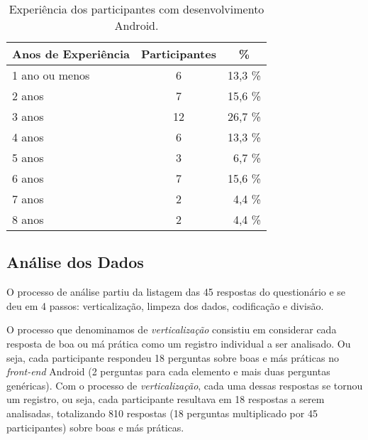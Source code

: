 \begin{table}[h]
\centering
\caption{Experi\^encia dos participantes com desenvolvimento Android.}
\small
\begin{tabular}{l|c|r}
\toprule
\textbf{Anos de Experi\^encia} & \textbf{Participantes} & \multicolumn{1}{c}{\textbf{\%}}  \\
\hline
1 ano ou menos 	&	 6 		& 	13,3 \%	 \\
2 anos 			& 	 7 		& 	15,6 \%	 \\
3 anos 			& 	 12		& 	26,7 \%	 \\
4 anos 			& 	 6 		& 	13,3 \%	 \\
5 anos 			& 	 3 		& 	 6,7 \%	 \\
6 anos 			& 	 7 		& 	15,6 \%	 \\
7 anos 			& 	 2 		& 	 4,4 \%	 \\
8 anos 			& 	 2 		& 	 4,4 \%	 \\
\toprule
\end{tabular}
\label{tab:DadosDemograficos}
\end{table}


\subsection{An\'alise dos Dados}
\label{sub:smells-definition}

O processo de an\'alise partiu da listagem das 45 respostas do question\'ario e se deu em 4 passos: verticaliza\c{c}\~ao, limpeza dos dados, codifica\c{c}\~ao e divis\~ao. 

O processo que denominamos de \textit{verticaliza\c{c}\~ao} consistiu em considerar cada resposta de boa ou m\'a pr\'atica como um registro individual a ser analisado. Ou seja, cada participante respondeu 18 perguntas sobre boas e m\'as pr\'aticas no \textit{front-end} Android (2 perguntas para cada elemento e mais duas perguntas gen\'ericas). Com o processo de \textit{verticaliza\c{c}\~ao}, cada uma dessas respostas se tornou um registro, ou seja, cada participante resultava em 18 respostas a serem analisadas, totalizando 810 respostas (18 perguntas multiplicado por 45 participantes) sobre boas e m\'as pr\'aticas.

